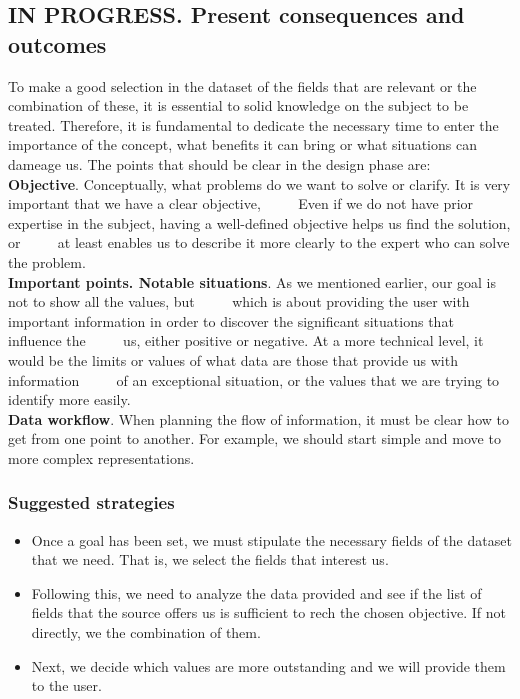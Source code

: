 \subsection{IN PROGRESS. Present consequences and outcomes}

To make a good selection in the dataset of the fields that are relevant or the combination of these, it is essential to
solid knowledge on the subject to be treated. Therefore, it is fundamental to dedicate the necessary time to enter the
importance of the concept, what benefits it can bring or what situations can dameage us.
The points that should be clear in the design phase are: \\

\textbf{Objective}. Conceptually, what problems do we want to solve or clarify. It is very important that we have a clear objective,
     Even if we do not have prior expertise in the subject, having a well-defined objective helps us find the solution, or
     at least enables us to describe it more clearly to the expert who can solve the problem. \\

\textbf{Important points. Notable situations}. As we mentioned earlier, our goal is not to show all the values, but
     which is about providing the user with important information in order to discover the significant situations that influence the
     us, either positive or negative. At a more technical level, it would be the limits or values of what data are those that provide us with information
     of an exceptional situation, or the values that we are trying to identify more easily. \\

\textbf{Data workflow}. When planning the flow of information, it must be clear how to get from one point to another. For example, 
we should start simple and move to more complex representations.

\subsubsection*{Suggested strategies} 

\begin{itemize}
    \item Once a goal has been set, we must stipulate the necessary fields of the dataset that we need. That is, we select the fields that interest us. 
    \item Following this, we need to analyze the data provided and see if the list of fields that the source offers us is sufficient to rech the chosen objective.
    If not directly, we the combination of them.
    \item Next, we decide which values are more outstanding and we will provide them to the user.
\end{itemize}

